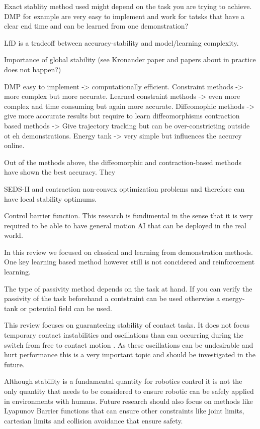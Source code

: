 
Exact stablity method used might depend on the task you are trying to achieve. DMP for example are very easy to implement and work for tatsks that have a clear end time and can be learned from one demonstration?

LfD is a tradeoff between accuracy-stability and model/learning complexity.

Importance of global stability (see Kronander paper and papers about in practice does not happen?)


DMP easy to implement -> computationally efficient.
Constraint methods -> more complex but more accurate.
Learned constraint methods -> even more complex and time consuming but again more accurate.
Diffeomophic methods -> give more acccurate results but require to learn diffeomorphisms
contraction based methods -> Give trajectory tracking but can be over-constricting outside ot eh demonstrations.
Energy tank -> very simple but influences the accurcy online.

Out of the methods above, the diffeomorphic and contraction-based methods have shown the best accuracy. They 

SEDS-II and contraction non-convex optimization problems and therefore can have local stability optimums.

Control barrier function. This research is fundimental in the sense that it is very required to be able to have general motion AI that can be deployed in the real world.

In this review we focused on classical and learning from demonstration methods. One key learning based method however still is not concidered and reinforcement learning.

The type of passivity method depends on the task at hand. If you can verify the passivity of the task beforehand a contstraint can be used otherwise a energy-tank or potential field can be used.

This review focuses on guaranteeing stability of contact tasks. It does not focus temporary contact instabilities and oscillations than can occurring during the switch from free to contact motion \cite{khansariAdaptiveHumaninspiredCompliant2016,salehianDynamicalSystemBasedApproachControlling2018}. As these oscillations can be undesirable and hurt performance this is a very important topic and should be investigated in the future.

Although stability is a fundamental quantity for robotics control it is not the only quantity that needs to be considered to ensure robotic can be safely applied in environments with humans. Future research should also focus on methods like Lyapunov Barrier functions that can ensure other constraints like joint limits, cartesian limits and collision avoidance that ensure safety.

